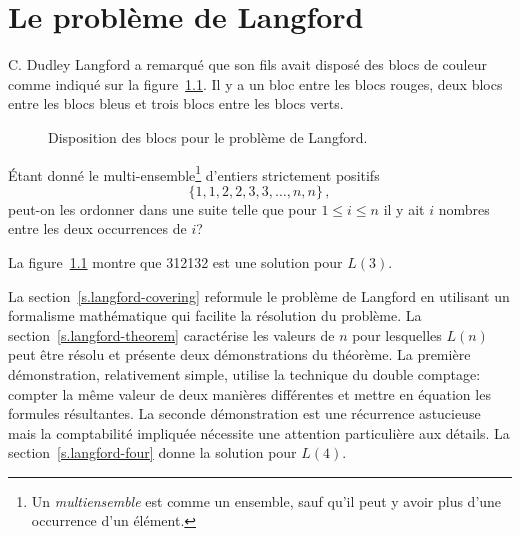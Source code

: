 \chapter{Le problème de Langford}\label{c.langford}




C. Dudley Langford a remarqué que son fils avait disposé des blocs de couleur comme indiqué sur la figure~\ref{f.langford}.
Il y a un bloc entre les blocs rouges, deux blocs entre les blocs bleus et trois blocs entre les blocs verts. 
\begin{figure}[ht]
\centering
{}
\caption{Disposition des blocs pour le problème de Langford.}\label{f.langford}
\end{figure}


\begin{definition} Étant donné le multi-ensemble\footnote{Un \emph{multiensemble} est comme un ensemble, sauf qu'il peut y avoir plus d'une occurrence d'un élément.}
 d'entiers strictement positifs 
\[
\{1,1,2,2,3,3,\ldots,n,n\}\,,
\]
peut-on les ordonner dans une suite telle que pour $1\leq i \leq n$ il y ait $i$ nombres entre les deux occurrences de $i$?
\end{definition}

La figure~\ref{f.langford} montre que 312132 est une solution pour $L(3)$.

\smallskip

La section~\ref{s.langford-covering} reformule le problème de Langford en utilisant un formalisme mathématique qui facilite la résolution du problème. La section~\ref{s.langford-theorem} caractérise les valeurs de $n$ pour lesquelles $L(n)$ peut être résolu et présente deux démonstrations du théorème. La première démonstration, relativement simple, utilise la technique du double comptage: compter la même valeur de deux manières différentes et mettre en équation les formules résultantes. La seconde démonstration est une récurrence astucieuse mais la \og comptabilité\fg{} impliquée nécessite une attention particulière aux détails. La section~\ref{s.langford-four} donne la solution pour $L(4)$.

